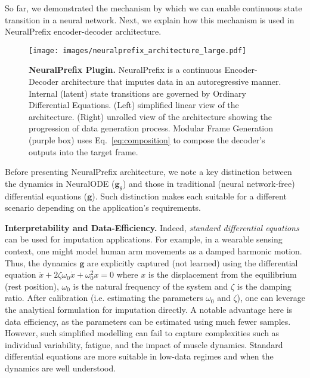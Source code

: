 \documentclass[10pt, conference, compsocconf]{IEEEtran}
\def\AK#1{{\bf [Abdo:} {\it\color{teal} {#1}}{\bf ]}}
\def\update#1{#1}
\begin{document}
So far, we demonstrated the mechanism by which we can enable continuous state transition in a neural network. Next, we explain how this mechanism is used in NeuralPrefix encoder-decoder architecture.



\begin{figure*}[t]
    \centering
    \texttt{[image: images/neuralprefix\_architecture\_large.pdf]}
    \caption{\textbf{NeuralPrefix Plugin.}
    NeuralPrefix is a continuous Encoder-Decoder architecture that imputes data in an autoregressive manner. Internal (latent) state transitions are governed by Ordinary  Differential Equations. (Left) simplified linear view \update{of the} architecture. (Right) unrolled view of the architecture showing the progression of data generation process. 
    Modular Frame Generation (purple box) uses Eq.~\ref{eq:composition} to compose the decoder's outputs into the target frame.}
    \label{fig:arhcitecture}
\end{figure*}

\update{Before presenting NeuralPrefix architecture, we note a key distinction between the dynamics in NeuralODE  ($\mathbf{g}_\theta$) and those in traditional (neural network-free) differential equations ($\mathbf{g}$). Such distinction makes each suitable for a different scenario depending on the application's requirements.}

\update{\textbf{Interpretability and Data-Efficiency.} Indeed, \textit{standard differential equations} can be used for imputation applications.  
For example, in a wearable sensing context, one might model human arm movements as a damped harmonic motion.} \update{Thus, the dynamics $\mathbf{g}$ are explicitly captured (not learned) using the differential equation $\ddot{x} + 2\zeta\omega_0\dot{x} + \omega_0^2 x = 0
$ where $x$ is the displacement from the equilibrium (rest position), $\omega_0$ is the natural frequency of the system and $\zeta$ is the damping ratio. After calibration (i.e. estimating the parameters $\omega_0$ and $\zeta$), one can leverage the analytical formulation for imputation directly. A notable advantage here is data efficiency, as the parameters can be estimated using much fewer samples. However, such simplified modelling can fail to capture complexities such as individual variability,  fatigue, and the impact of muscle dynamics. Standard differential equations are more suitable in low-data regimes and when the dynamics are well understood. }
\end{document}
